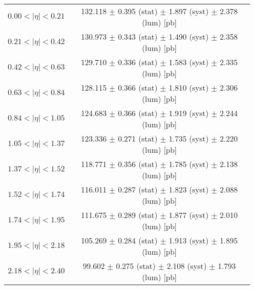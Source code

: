 \begin{tabular}{lc}
\hline
$0.00 < |\eta| <0.21$          & 132.118 $\pm$ 0.395 (stat) $\pm$ 1.897 (syst) $\pm$ 2.378 (lum) [pb]  \\
$0.21 < |\eta| <0.42$          & 130.973 $\pm$ 0.343 (stat) $\pm$ 1.490 (syst) $\pm$ 2.358 (lum) [pb]  \\
$0.42 < |\eta| <0.63$          & 129.710 $\pm$ 0.336 (stat) $\pm$ 1.583 (syst) $\pm$ 2.335 (lum) [pb]  \\
$0.63 < |\eta| <0.84$          & 128.115 $\pm$ 0.366 (stat) $\pm$ 1.810 (syst) $\pm$ 2.306 (lum) [pb]  \\
$0.84 < |\eta| <1.05$          & 124.683 $\pm$ 0.366 (stat) $\pm$ 1.919 (syst) $\pm$ 2.244 (lum) [pb]  \\
$1.05 < |\eta| <1.37$          & 123.336 $\pm$ 0.271 (stat) $\pm$ 1.735 (syst) $\pm$ 2.220 (lum) [pb]  \\
$1.37 < |\eta| <1.52$          & 118.771 $\pm$ 0.356 (stat) $\pm$ 1.785 (syst) $\pm$ 2.138 (lum) [pb]  \\
$1.52 < |\eta| <1.74$          & 116.011 $\pm$ 0.287 (stat) $\pm$ 1.823 (syst) $\pm$ 2.088 (lum) [pb]  \\
$1.74 < |\eta| <1.95$          & 111.675 $\pm$ 0.289 (stat) $\pm$ 1.877 (syst) $\pm$ 2.010 (lum) [pb]  \\
$1.95 < |\eta| <2.18$          & 105.269 $\pm$ 0.284 (stat) $\pm$ 1.913 (syst) $\pm$ 1.895 (lum) [pb]  \\
$2.18 < |\eta| <2.40$          & 99.602 $\pm$ 0.275 (stat) $\pm$ 2.108 (syst) $\pm$ 1.793 (lum) [pb]  \\
\hline
\end{tabular}

